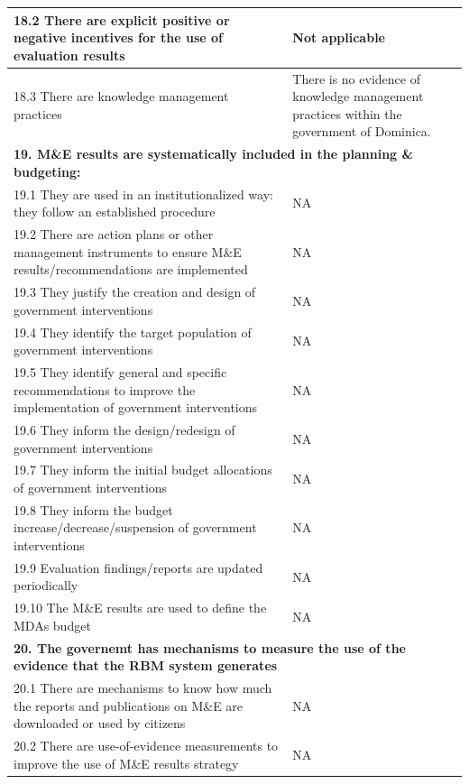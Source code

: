 \documentclass[
  10pt,
]{book}
\begin{document}
\begin{table}
\begin{tabular}[t]{l|l}
\hline
\hspace{1em}18.2 There are explicit positive or negative incentives for the use of evaluation results & Not applicable\\
\hline
\hspace{1em}18.3 There are knowledge management practices & There is no evidence of knowledge management practices within the government of Dominica.\\
\hline
\multicolumn{2}{l}{\textbf{19. M\&E results are systematically included in the planning \& budgeting:}}\\
\hline
\hspace{1em}19.1 They are used in an institutionalized way: they follow an established procedure & NA\\
\hline
\hspace{1em}19.2 There are action plans or other management instruments to ensure M\&E results/recommendations are implemented & NA\\
\hline
\hspace{1em}19.3 They justify the creation and design of government interventions & NA\\
\hline
\hspace{1em}19.4 They identify the target population of government interventions & NA\\
\hline
\hspace{1em}19.5 They identify general and specific recommendations to improve the implementation of government interventions & NA\\
\hline
\hspace{1em}19.6 They inform the design/redesign of government interventions & NA\\
\hline
\hspace{1em}19.7 They inform the initial budget allocations of government interventions & NA\\
\hline
\hspace{1em}19.8 They inform the budget increase/decrease/suspension of government interventions & NA\\
\hline
\hspace{1em}19.9 Evaluation findings/reports are updated periodically & NA\\
\hline
\hspace{1em}19.10 The M\&E results are used to define the MDAs budget & NA\\
\hline
\multicolumn{2}{l}{\textbf{20. The governemt has mechanisms to measure the use of the evidence that the RBM system generates}}\\
\hline
\hspace{1em}20.1 There are mechanisms to know how much the reports and publications on M\&E are downloaded or used by citizens & NA\\
\hline
\hspace{1em}20.2 There are use-of-evidence measurements to improve the use of M\&E results strategy & NA\\
\hline
\end{tabular}
\end{table}
\end{document}
